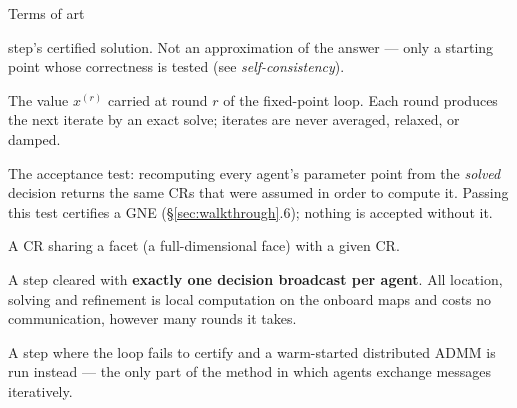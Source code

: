 \documentclass[11pt, letterpaper]{article}
\begin{document}
\begin{keybox}{Terms of art}
\begin{description}[leftmargin=0pt,labelindent=0pt,style=nextline,nosep,itemsep=2pt]
step's certified solution. Not an approximation of the answer --- only a starting point whose
correctness is tested (see \emph{self-consistency}).
\item[Iterate] The value $x^{(r)}$ carried at round $r$ of the fixed-point loop. Each round produces
the next iterate by an exact solve; iterates are never averaged, relaxed, or damped.
\item[Self-consistency] The acceptance test: recomputing every agent's parameter point from the
\emph{solved} decision returns the same CRs that were assumed in order to compute it. Passing this
test certifies a GNE (\S\ref{sec:walkthrough}.6); nothing is accepted without it.
\item[Facet neighbour] A CR sharing a facet (a full-dimensional face) with a given CR.
\item[Iteration-free step] A step cleared with \textbf{exactly one decision broadcast per agent}. All
location, solving and refinement is local computation on the onboard maps and costs no communication,
however many rounds it takes.
\item[Fallback step] A step where the loop fails to certify and a warm-started distributed ADMM is run
instead --- the only part of the method in which agents exchange messages iteratively.
\end{description}
\end{keybox}
\end{document}
